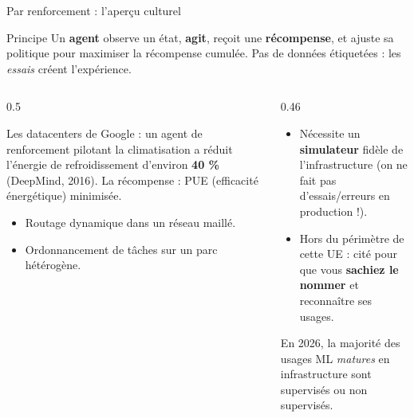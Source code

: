 \begin{frame}{Par renforcement : l'aperçu culturel}
\footnotesize%
\begin{block}{Principe}
Un \textbf{agent} observe un état, \textbf{agit}, reçoit une \textbf{récompense},
et ajuste sa politique pour maximiser la récompense cumulée.
Pas de données étiquetées : les \emph{essais} créent l'expérience.
\end{block}
\begin{columns}[t]
\begin{column}{0.5\textwidth}
\begin{ebox}
Les datacenters de Google : un agent de renforcement pilotant la
climatisation a réduit l'énergie de refroidissement d'environ \textbf{40 \%}
(DeepMind, 2016). La récompense : PUE (efficacité énergétique) minimisée.
\end{ebox}
\begin{ebox}
\begin{itemize}
\item Routage dynamique dans un réseau maillé.
\item Ordonnancement de tâches sur un parc hétérogène.
\end{itemize}
\end{ebox}
\end{column}
\begin{column}{0.46\textwidth}
\begin{wbox}
\begin{itemize}
\item Nécessite un \textbf{simulateur} fidèle de l'infrastructure
(on ne fait pas d'essais/erreurs en production !).
\item Hors du périmètre de cette UE : cité pour que vous
\textbf{sachiez le nommer} et reconnaître ses usages.
\end{itemize}
\end{wbox}
\begin{center}\small
En 2026, la majorité des usages ML \emph{matures} en infrastructure
sont supervisés ou non supervisés.
\end{center}
\end{column}
\end{columns}
\end{frame}

